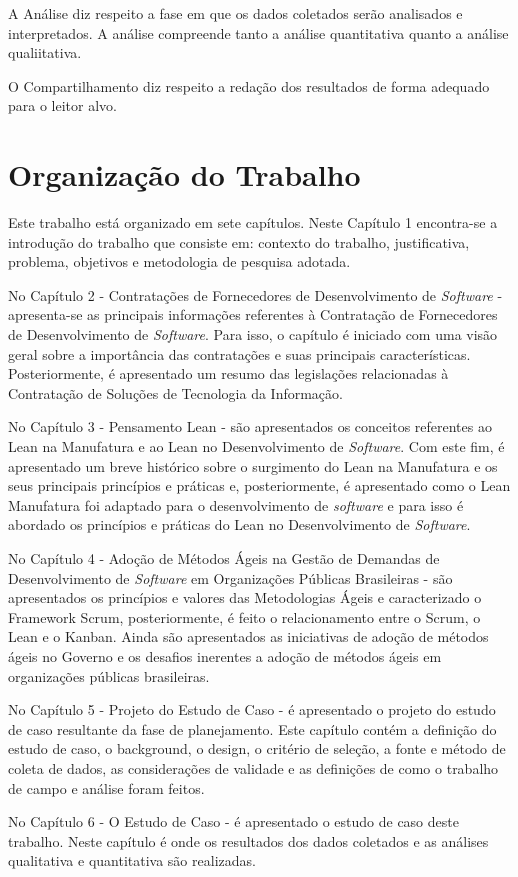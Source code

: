 A Análise diz respeito a fase em que os dados coletados serão analisados e interpretados. A análise compreende tanto a análise quantitativa quanto a análise qualiitativa.

O Compartilhamento diz respeito a redação dos resultados de forma adequado para o leitor alvo.

\section[Organização do Trabalho]{Organização do Trabalho}

Este trabalho está organizado em sete capítulos. Neste Capítulo 1 encontra-se a introdução do trabalho que consiste em: contexto do trabalho,  justificativa,  problema, objetivos e metodologia de pesquisa adotada.

No Capítulo 2 - Contratações de Fornecedores de Desenvolvimento de \textit{Software} - apresenta-se as principais informações referentes à Contratação de Fornecedores de Desenvolvimento de \textit{Software}. Para isso, o capítulo é iniciado com uma visão geral sobre a importância das contratações e suas principais características. Posteriormente, é apresentado um resumo das legislações relacionadas à Contratação de Soluções de Tecnologia da Informação.

No Capítulo 3 - Pensamento Lean - são apresentados os conceitos referentes ao Lean na Manufatura e ao Lean no Desenvolvimento de \textit{Software}. Com este fim, é apresentado um breve histórico sobre o surgimento do Lean na Manufatura e os seus principais princípios e práticas e, posteriormente, é apresentado como o Lean Manufatura foi adaptado para o desenvolvimento de \textit{software} e para isso é abordado os princípios e práticas do Lean no Desenvolvimento de \textit{Software}.

No Capítulo 4  - Adoção de Métodos Ágeis na Gestão de Demandas de Desenvolvimento de \textit{Software} em Organizações Públicas Brasileiras - são apresentados os princípios e valores das Metodologias Ágeis e caracterizado o Framework Scrum, posteriormente, é feito o relacionamento entre o Scrum, o Lean e o Kanban. Ainda são apresentados as iniciativas de adoção de métodos ágeis no Governo e os desafios inerentes a adoção de métodos ágeis em organizações públicas brasileiras.

No Capítulo 5 - Projeto do Estudo de Caso - é apresentado o projeto do estudo de caso resultante da fase de planejamento. Este capítulo contém a definição do estudo de caso, o background, o design, o critério de seleção, a fonte e método de coleta de dados, as considerações de validade e as definições de como o trabalho de campo e análise foram feitos.

No Capítulo 6 -  O Estudo de Caso - é apresentado o estudo de caso deste trabalho. Neste capítulo é onde os resultados dos dados coletados e as análises qualitativa e quantitativa são realizadas. 
